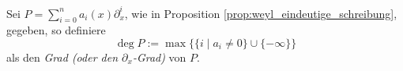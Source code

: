 \begin{comment}
Besser?:\\
erst Filtrierung definieren und dadurch dann den Grad?
\end{comment}
\begin{defn}
Sei $P=\sum_{i=0}^na_i(x)\partial_x^i$, wie in Proposition
\ref{prop:weyl_eindeutige_schreibung}, gegeben, so definiere
\[
\deg P:=\max\Big\{\{i\mid a_i\neq 0\}\cup\{-\infty\}\Big\}
\]
als den \emph{Grad (oder den $\partial_x$-Grad)}
von $P$.
\end{defn}
\begin{comment}
In natürlicher Weise erhält man die aufsteigende Filtrierung
$F_N\cD:=\{P\in\cD|\deg P\leq N\}$ mit
\[
\cdots\subset F_{-1}\cD\subset F_{0}\cD\subset
F_{1}\cD\subset\cdots\subset\cD
\]
und erhalte $gr_k^F\cD\bydef F_N\cD\slash F_{N-1}\cD
=\{P\in\cD|\deg P=N\}\cong\C\{x\}$.

\begin{proof}[Beweisidee]
Sei $P\in F_N\cD$, so betrachte den Isomorphismus $F_N\cD\slash
F_{N-1}\cD\rightarrow \C\{x\}$ definiert durch $[P]=P+F_{N-1}\cD\mapsto
a_n(x)$.
\end{proof}

\begin{prop}
Es gilt:
\begin{center}
\begin{tikzpicture} [descr/.style={fill=white,inner sep=2.5pt}]
\matrix (m) [
  matrix of math nodes,
  row sep=1em,
  text height=1.5ex,
  text depth=0.25ex]
{
  gr^F\cD &
  := \bigoplus_{N\in\Z}gr_N^F\cD = \bigoplus_{N\in\N_0}gr_N^F\cD \cong
  \bigoplus_{N\in\N_0}\C\{x\} \cong \C\{x\}[\xi] = &
  \bigoplus_{N\in\N_0}\C\{x\}\cdot \xi^N \\
};
\path[solid]
(m-1-1) edge [bend right=15] node[descr]{$\cong$}
  node[below]{$\mbox{isomorph als grad. Ringe}$} (m-1-3);
\end{tikzpicture}
\end{center}
also $gr^F\cD \cong \bigoplus_{N\in\N_0}\C\{x\}\cdot \xi^N$ als gradierte
Ringe.
\end{prop}
\begin{proof}
TODO: Treffen?
\end{proof}
\end{comment}

